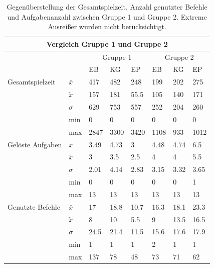 \begin{table}[htbp]
\centering
\begin{tabular}{ p{3.5cm} | p{0.75cm} | p{1cm} p{1cm}  p{1cm} || p{1cm} p{1cm} p{1cm}}
 \hline
 \multicolumn{8}{c}{Vergleich Gruppe 1 und Gruppe 2} \\
 \hline
 & & \multicolumn{3}{c||}{Gruppe 1} & \multicolumn{3}{c}{Gruppe 2}\\
 & & EB & KG & EP & EB & KG & EP\\
 \hline
  Gesamtspielzeit   & $\bar{x}$     & 417   & 482   & 248   & 199  & 202  & 275   \\
                    & $\tilde{x}$   & 157   & 181   & 55.5  & 105  & 140  & 171   \\
                    & $\sigma$      & 629   & 753   & 557   & 252  & 204  & 260   \\
                    & min           & 0     & 0     & 0     & 0    & 0    & 0     \\
                    & max           & 2847  & 3300  & 3420  & 1108 & 933  & 1012  \\
 \hline
  Gelöste Aufgaben  & $\bar{x}$     & 3.49  & 4.73  & 3     & 4.48 & 4.74   & 6.5     \\
                    & $\tilde{x}$   & 3     & 3.5   & 2.5   & 4    & 4      & 5.5     \\
                    & $\sigma$      & 2.01  & 4.14  & 2.83  & 3.15 & 3.32   & 3.65     \\
                    & min           & 0     & 0     & 0     & 0    & 0      & 1     \\
                    & max           & 13    & 13    & 13    & 13   & 13     & 13     \\
  \hline
  Genutzte Befehle  & $\bar{x}$     & 17   & 18.8   & 10.7  & 16.3   & 18.1   & 23.3     \\
                    & $\tilde{x}$   & 8    & 10     & 5.5   & 9      & 13.5   & 16.5     \\
                    & $\sigma$      & 24.5 & 21.4   & 11.5  & 15.6   & 17.6   & 17.9     \\
                    & min           & 1    & 1      & 1     & 2      & 1      & 1     \\
                    & max           & 137  & 78     & 48    & 73     & 71     & 62     \\

  
 \hline
\end{tabular}
\caption{Gegenüberstellung der Gesamtspielzeit, Anzahl genutzter Befehle und Aufgabenanzahl zwischen Gruppe 1 und Gruppe 2. Extreme Ausreißer wurden nicht berücksichtigt.}
\label{final}
\end{table}



